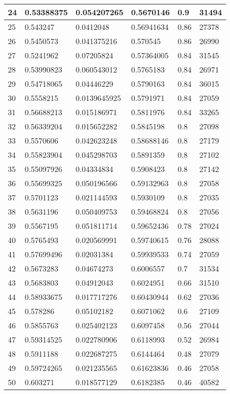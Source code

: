 \begin{longtable}{|l|l|l|l|l|l|}
24 & 0.53388375 & 0.054207265 & 0.5670146 & 0.9 & 31494 \\ \hline 
25 & 0.543247 & 0.0412048 & 0.56941634 & 0.86 & 27378 \\ \hline 
26 & 0.5450573 & 0.041375216 & 0.570545 & 0.86 & 26990 \\ \hline 
27 & 0.5241962 & 0.07205824 & 0.57364005 & 0.84 & 31545 \\ \hline 
28 & 0.53990823 & 0.060543012 & 0.5765183 & 0.84 & 26971 \\ \hline 
29 & 0.54718065 & 0.04446229 & 0.5790163 & 0.84 & 36015 \\ \hline 
30 & 0.5558215 & 0.0139645925 & 0.5791971 & 0.84 & 27059 \\ \hline 
31 & 0.56688213 & 0.015186971 & 0.5811976 & 0.84 & 33265 \\ \hline 
32 & 0.56339204 & 0.015652282 & 0.5845198 & 0.8 & 27098 \\ \hline 
33 & 0.5570606 & 0.042623248 & 0.58688146 & 0.8 & 27179 \\ \hline 
34 & 0.55823904 & 0.045298703 & 0.5891359 & 0.8 & 27102 \\ \hline 
35 & 0.55097926 & 0.04334834 & 0.5908423 & 0.8 & 27142 \\ \hline 
36 & 0.55699325 & 0.050196566 & 0.59132963 & 0.8 & 27058 \\ \hline 
37 & 0.5701123 & 0.021144593 & 0.5930109 & 0.8 & 27035 \\ \hline 
38 & 0.5631196 & 0.050409753 & 0.59468824 & 0.8 & 27056 \\ \hline 
39 & 0.5567195 & 0.051811714 & 0.59652436 & 0.78 & 27024 \\ \hline 
40 & 0.5765493 & 0.020569991 & 0.59740615 & 0.76 & 28088 \\ \hline 
41 & 0.57699496 & 0.02031384 & 0.59939533 & 0.74 & 27059 \\ \hline 
42 & 0.5673283 & 0.04674273 & 0.6006557 & 0.7 & 31534 \\ \hline 
43 & 0.5683803 & 0.04912043 & 0.6024951 & 0.66 & 31510 \\ \hline 
44 & 0.58933675 & 0.017717276 & 0.60430944 & 0.62 & 27036 \\ \hline 
45 & 0.578286 & 0.05102182 & 0.6071062 & 0.6 & 27109 \\ \hline 
46 & 0.5855763 & 0.025402123 & 0.6097458 & 0.56 & 27044 \\ \hline 
47 & 0.59314525 & 0.022780906 & 0.6118993 & 0.52 & 26984 \\ \hline 
48 & 0.5911188 & 0.022687275 & 0.6144464 & 0.48 & 27079 \\ \hline 
49 & 0.59724265 & 0.021235565 & 0.61623836 & 0.46 & 27058 \\ \hline 
50 & 0.603271 & 0.018577129 & 0.6182385 & 0.46 & 40582 \\ \hline 
\end{longtable}